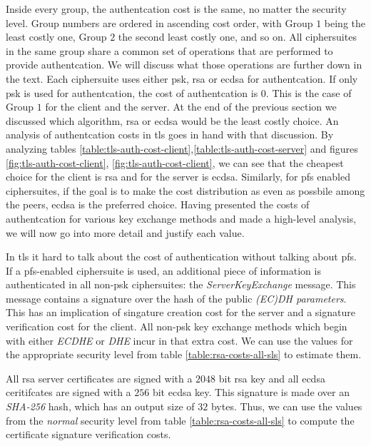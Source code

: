 \documentclass{llncs}
\begin{document}
Inside every group, the authentcation cost is the same, no matter the security level. Group numbers are ordered in ascending cost order, with Group $1$ 
being the least costly one, Group $2$ the second least costly one, and so on. All ciphersuites in the same group share a common set of operations that 
are performed to provide authentcation. We will discuss what those operations are further down in the text. Each ciphersuite uses either \gls{psk}, 
\gls{rsa} or \gls{ecdsa} for authentcation. If only \gls{psk} is used for authentcation, the cost of authentcation is $0$. This is the case of Group 
$1$ for the client and the server. At the end of the previous section we discussed which algorithm, \gls{rsa} or \gls{ecdsa} would be the least costly 
choice. An analysis of authentcation costs in \gls{tls} goes in hand with that discussion. By analyzing tables \ref{table:tls-auth-cost-client},\ref{table:tls-auth-cost-server} 
and figures \ref{fig:tls-auth-cost-client}, \ref{fig:tls-auth-cost-client}, we can see that the cheapest choice for the client is \gls{rsa} and for the
server is \gls{ecdsa}. Similarly, for \gls{pfs} enabled ciphersuites, if the goal is to make the cost distribution as even as possbile among the peers, 
\gls{ecdsa} is the preferred choice. Having presented the costs of authentcation for various key exchange methods and made a high-level analysis, we will now go into more detail and
justify each value.

In \gls{tls} it hard to talk about the cost of authentication without  talking about \gls{pfs}. If a \gls{pfs}-enabled
ciphersuite is used, an additional piece of information is authenticated in all non-\gls{psk} ciphersuites: the \textit{ServerKeyExchange} message.
This message contains a signature over the hash of the public \textit{(EC)DH parameters}. This has an implication of singature creation cost
for the server and a signature verification cost for the client. All non-\gls{psk} key exchange methods which begin with either 
\textit{ECDHE} or \textit{DHE} incur in that extra cost.  We can use the values for the appropriate security level from table 
\ref{table:rsa-costs-all-sls} to estimate them. 

All \gls{rsa} server certificates are signed with a $2048$ bit \gls{rsa} key and all \gls{ecdsa} ceritifcates
are signed with a $256$ bit \gls{ecdsa} key. This signature is made over an \textit{SHA-256} hash, which has an output size of $32$ bytes.
Thus, we can use the values from the \textit{normal} security level from table \ref{table:rsa-costs-all-sls} to compute the certificate signature
verification costs.
\end{document}
